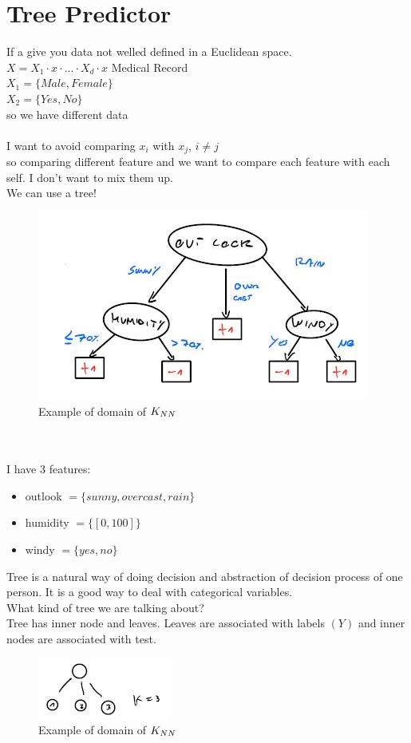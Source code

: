 \documentclass[../main.tex]{subfiles}
\begin{document}
\section{Tree Predictor}
If a give you data not welled defined in a Euclidean space.
\\
$X = X_1 \cdot x \cdot ... \cdot X_d \cdot x$ \qquad Medical Record
\\
$X_1 = \{Male, Female\}$\\
$X_2 = \{Yes, No\}$
\\
so we have different data
\\\\
I want to avoid comparing $x_i$ with $x_j$,  $i\neq j $\\
so comparing different feature and we want to compare each feature with
each self. I don’t want to mix them up.\\
We can use a tree!
\begin{figure}[h]
    \centering
    \includegraphics[width=0.5\linewidth]{../img/lez4-img2.JPG}
    \caption{Example of domain of $K_{NN}$}
\end{figure}\\
\\
I have 3 features:
\begin{itemize}
\item outlook  $= \{sunny, overcast, rain\}$
\item humidity $= \{[0,100]\}$
\item windy $ = \{yes,no\}$
\end{itemize}
Tree is a natural way of doing decision and abstraction of decision process of
one person. It is a good way to deal with categorical variables.\\
What kind of tree we are talking about?\\
Tree has inner node and leaves. Leaves are associated with labels $(Y)$ and
inner nodes are associated with test.
\begin{figure}[h]
    \centering
    \includegraphics[width=0.3\linewidth]{../img/lez4-img3.JPG}
    \caption{Example of domain of $K_{NN}$}
\end{figure}\\
\end{document}
